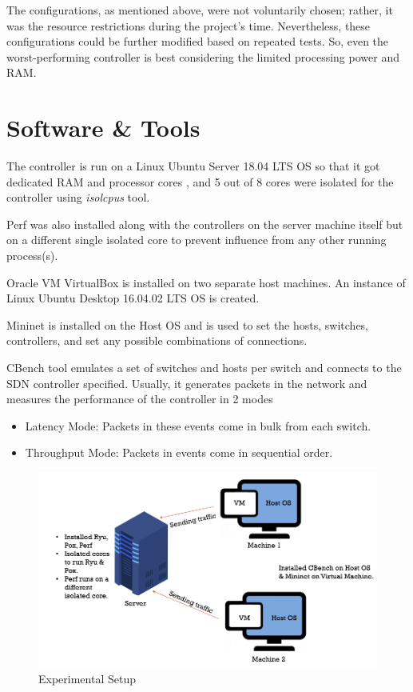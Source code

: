 The configurations, as mentioned above, were not voluntarily chosen; rather, it was the resource restrictions during the project's time. Nevertheless, these configurations could be further modified based on repeated tests. So, even the worst-performing controller is best considering the limited processing power and RAM.

\section{Software \& Tools}
The controller is run on a Linux Ubuntu Server 18.04 LTS OS so that it got dedicated RAM and processor cores \cite{resshare1970}, and 5 out of 8 cores were isolated for the controller using \textit{isolcpus} tool.

Perf was also installed along with the controllers on the server machine itself but on a different single isolated core to prevent influence from any other running process(s).

Oracle VM VirtualBox is installed on two separate host machines. An instance of Linux Ubuntu Desktop 16.04.02 LTS OS is created.

Mininet is installed on the Host OS and is used to set the hosts, switches, controllers, and set any possible combinations of connections.

CBench tool emulates a set of switches and hosts per switch and connects to the SDN controller specified. Usually, it generates packets in the network and measures the performance of the controller in 2 modes
    \begin{itemize}
        \item Latency Mode: Packets in these events come in bulk from each switch.
        \item Throughput Mode: Packets in events come in sequential order.
    \end{itemize}

\begin{figure}[!hbt]
    \centering
        \includegraphics[width=\textwidth,keepaspectratio]{images/setup.png}
       \caption{Experimental Setup}
        \label{experimentalsetup}
\end{figure}

